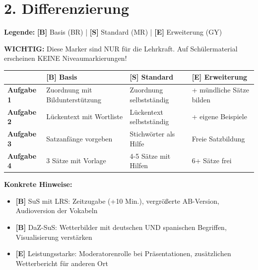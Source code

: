 \documentclass[11pt, a4paper]{article}
\newcommand{\B}{\textcolor{basis}{\textbf{[B]}}}
\newcommand{\Std}{\textcolor{standard}{\textbf{[S]}}}
\newcommand{\E}{\textcolor{erweiterung}{\textbf{[E]}}}
\begin{document}

\section*{2. Differenzierung}

\begin{differenzierung}
\textbf{Legende:} \B{} Basis (BR) | \Std{} Standard (MR) | \E{} Erweiterung (GY)

\vspace{0.5em}

\textbf{WICHTIG:} Diese Marker sind NUR für die Lehrkraft. Auf Schülermaterial erscheinen KEINE Niveaumarkierungen!
\end{differenzierung}

\vspace{1em}

\begin{tabularx}{\textwidth}{|l|X|X|X|}
\hline
& \B{} \textbf{Basis} & \Std{} \textbf{Standard} & \E{} \textbf{Erweiterung} \\
\hline
\textbf{Aufgabe 1} & Zuordnung mit Bildunterstützung & Zuordnung selbstständig & + mündliche Sätze bilden \\
\hline
\textbf{Aufgabe 2} & Lückentext mit Wortliste & Lückentext selbstständig & + eigene Beispiele \\
\hline
\textbf{Aufgabe 3} & Satzanfänge vorgeben & Stichwörter als Hilfe & Freie Satzbildung \\
\hline
\textbf{Aufgabe 4} & 3 Sätze mit Vorlage & 4-5 Sätze mit Hilfen & 6+ Sätze frei \\
\hline
\end{tabularx}

\vspace{1em}

\textbf{Konkrete Hinweise:}
\begin{itemize}
    \item \B{} SuS mit LRS: Zeitzugabe (+10 Min.), vergrößerte AB-Version, Audioversion der Vokabeln
    \item \B{} DaZ-SuS: Wetterbilder mit deutschen UND spanischen Begriffen, Visualisierung verstärken
    \item \E{} Leistungsstarke: Moderatorenrolle bei Präsentationen, zusätzlichen Wetterbericht für anderen Ort
\end{itemize}
\end{document}
